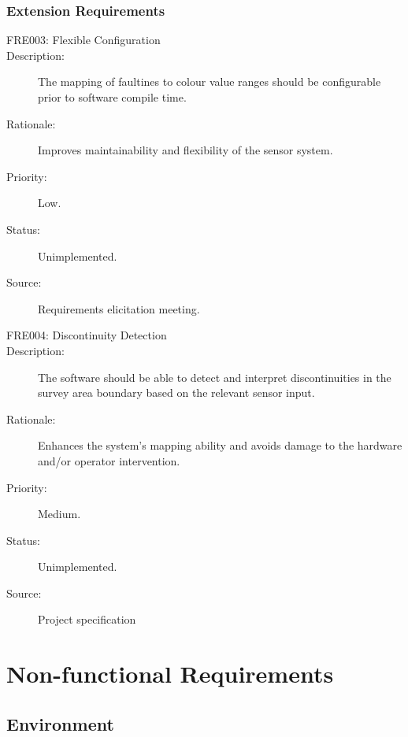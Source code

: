 \documentclass[12pt]{article}
\begin{document}
\subsubsection{Extension Requirements}
\begin{description}
\item [{FRE003: Flexible Configuration}\label{FRE003}] 
\item [{Description: }\label{Description}] The mapping of faultines to colour value ranges should be configurable prior to software compile time. 
\item[{Rationale: }\label{Rationale}] Improves maintainability and flexibility of the sensor system.
\item[{Priority: }\label{Priority}] Low.
\item[{Status: }\label{Status}] Unimplemented.
\item[{Source: }\label{Source}] Requirements elicitation meeting.

\item [{FRE004: Discontinuity Detection}\label{FRE004}] 
\item [{Description: }\label{Description}] The software should be able to detect and interpret discontinuities in the survey area boundary based on the relevant sensor input.
\item[{Rationale: }\label{Rationale}] Enhances the system's mapping ability and avoids damage to the hardware and/or operator intervention.
\item[{Priority: }\label{Priority}] Medium.
\item[{Status: }\label{Status}] Unimplemented.
\item[{Source: }\label{Source}] Project specification \cite{spec}

\end{description}

\section{Non-functional Requirements}\label{nonrec}
\subsection{Environment}
\end{document}
